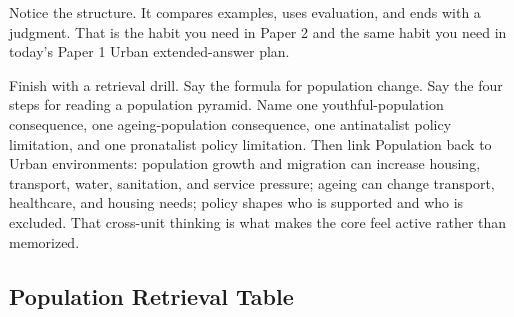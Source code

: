 \documentclass[11pt,a4paper]{article}
\begin{document}
Notice the structure. It compares examples, uses evaluation, and ends with a
judgment. That is the habit you need in Paper 2 and the same habit you need in
today's Paper 1 Urban extended-answer plan.

Finish with a retrieval drill. Say the formula for population change. Say the
four steps for reading a population pyramid. Name one youthful-population
consequence, one ageing-population consequence, one antinatalist policy
limitation, and one pronatalist policy limitation. Then link Population back to
Urban environments: population growth and migration can increase housing,
transport, water, sanitation, and service pressure; ageing can change transport,
healthcare, and housing needs; policy shapes who is supported and who is
excluded. That cross-unit thinking is what makes the core feel active rather
than memorized.

\subsection{Population Retrieval Table}
\end{document}
